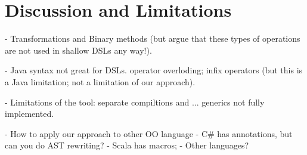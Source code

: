 \section{Discussion and Limitations}

- Transformations and Binary methods (but argue that 
these types of operations are not used in shallow DSLs 
any way!).

- Java syntax not great for DSLs. 
operator overloding; infix operators (but this is a Java limitation; 
not a limitation of our approach).

- Limitations of the tool: separate compiltions and ... 
generics not fully implemented.

- How to apply our approach to other OO language 
  - C\# has annotations, but can you do AST rewriting?
  - Scala has macros;
  - Other languages? 
